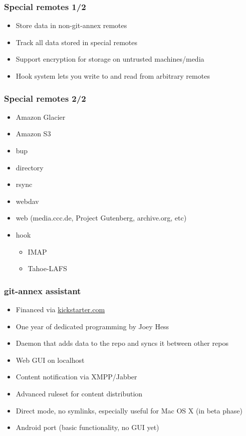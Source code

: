 \documentclass[t]{beamer}
\begin{document}
\begin{frame}
	\frametitle{Special remotes 1/2}
	\begin{itemize}
		\item Store data in non-git-annex remotes
		\item Track all data stored in special remotes
		\item Support encryption for storage on untrusted machines/media
		\item Hook system lets you write to and read from arbitrary remotes
	\end{itemize}
\end{frame}

\begin{frame}
	\frametitle{Special remotes 2/2}
	\begin{itemize}
		\item Amazon Glacier
		\item Amazon S3
		\item bup
		\item directory
		\item rsync
		\item webdav
		\item web (media.ccc.de, Project Gutenberg, archive.org, etc)
		\item hook
		\begin{itemize}
			\item IMAP
			\item Tahoe-LAFS
		\end{itemize}
	\end{itemize}
\end{frame}

\begin{frame}
	\frametitle{git-annex assistant}
	\begin{itemize}
		\item Financed via \url{kickstarter.com}
		\item One year of dedicated programming by Joey Hess
		\item Daemon that adds data to the repo and syncs it between other repos
		\item Web GUI on localhost
		\item Content notification via XMPP/Jabber
		\item Advanced ruleset for content distribution
		\item Direct mode, no symlinks, especially useful for Mac OS X (in beta phase)
		\item Android port (basic functionality, no GUI yet)
	\end{itemize}
\end{frame}
\end{document}
